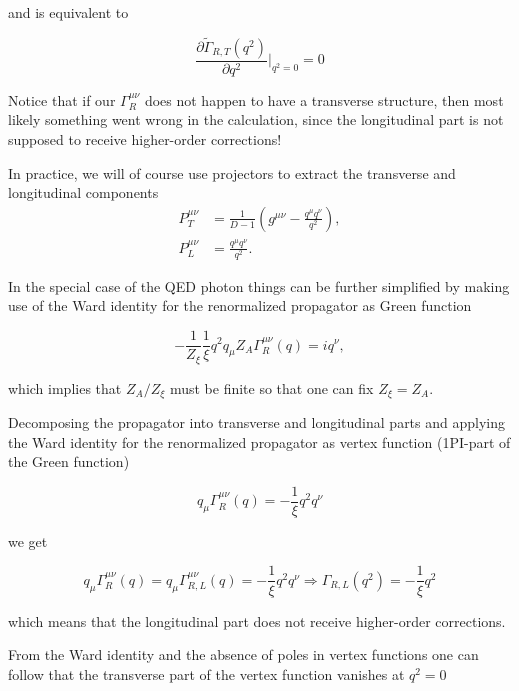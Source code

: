 \documentclass[../FeynCalcManual.tex]{subfiles}
\begin{document}
and is equivalent to

\begin{equation}
        \frac{\partial \tilde{\Gamma}_{R,T} (q^2) }{\partial q^2} \biggl |_{q^2=0} = 0
\end{equation}

Notice that if our \(\Gamma_R^{\mu \nu}\) does not happen to have a
transverse structure, then most likely something went wrong in the
calculation, since the longitudinal part is not supposed to receive
higher-order corrections!

In practice, we will of course use projectors to extract the transverse
and longitudinal components \begin{align*}
        P^{\mu \nu}_T &= \frac{1}{D-1}  \left ( g^{\mu \nu} - \frac{q^\mu q^\nu}{q^2} \right ), \\
        P^{\mu \nu}_L &= \frac{q^\mu q^\nu}{q^2}.
\end{align*}

In the special case of the QED photon things can be further simplified
by making use of the Ward identity for the renormalized propagator as
Green function

\begin{equation}
    -\frac{1}{Z_\xi} \frac{1}{\xi} q^2 q_\mu Z_A \Gamma_R^{\mu \nu} (q) = i q^\nu,
\end{equation}

which implies that \(Z_A/Z_{\xi}\) must be finite so that one can fix
\(Z_\xi = Z_A\).

Decomposing the propagator into transverse and longitudinal parts and
applying the Ward identity for the renormalized propagator as vertex
function (1PI-part of the Green function)

\begin{equation}
    q_\mu   \Gamma_R^{\mu \nu} (q) = - \frac{1}{\xi} q^2 q^\nu 
\end{equation}

we get

\begin{equation}
    q_\mu   \Gamma_R^{\mu \nu} (q) = q_\mu \Gamma_{R,L}^{\mu \nu} (q) = - \frac{1}{\xi} q^2 q^\nu \Rightarrow  \Gamma_{R,L} (q^2) = - \frac{1}{\xi} q^2
\end{equation}

which means that the longitudinal part does not receive higher-order
corrections.

From the Ward identity and the absence of poles in vertex functions one
can follow that the transverse part of the vertex function vanishes at
\(q^2=0\)
\end{document}
